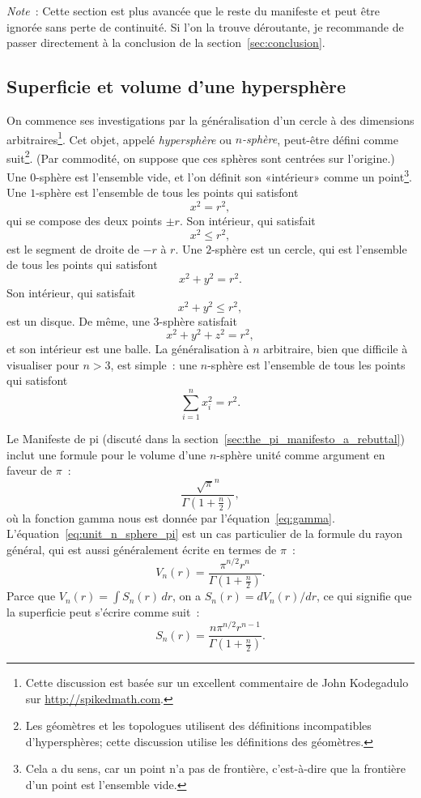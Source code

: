 \emph{Note}~: Cette section est plus avancée que le reste du manifeste et peut
être ignorée sans perte de continuité. Si l'on la trouve déroutante, je
recommande de passer directement à la conclusion de la
section~\ref{sec:conclusion}.

  \subsection{Superficie et volume d'une hypersphère} %
  \label{sec:volume_of_a_hypersphere}

On commence ses investigations par la généralisation d'un cercle à des
dimensions arbitraires\ns\footnote{Cette discussion est basée sur un excellent
commentaire de John Kodegadulo sur \url{http://spikedmath.com}.}. Cet objet,
appelé \emph{hypersphère} ou \emph{$n$-sphère}, peut-être défini comme
suit\ns\footnote{Les géomètres et les topologues utilisent des définitions
incompatibles d'hypersphères\ns; cette discussion utilise les définitions des
géomètres.}. (Par commodité, on suppose que ces sphères sont centrées sur
l'origine.) Une $0$-sphère est l'ensemble vide, et l'on définit son
«\ns intérieur\ns » comme un point\ns\footnote{Cela a du sens, car un point n'a pas
de frontière, c'est-à-dire que la frontière d'un point est l'ensemble vide.}.
Une $1$-sphère est l'ensemble de tous les points qui satisfont
\[
x^2 = r^2,
\]
qui se compose des deux points $\pm r$. Son intérieur, qui satisfait
\[
x^2 \leq r^2,
\]
est le segment de droite de $-r$ à $r$. Une $2$-sphère est un cercle, qui est
l'ensemble de tous les points qui satisfont
\[
x^2 + y^2 = r^2.
\]
Son intérieur, qui satisfait
\[
x^2 + y^2 \leq r^2,
\]
est un disque. De même, une $3$-sphère satisfait
\[
x^2 + y^2 + z^2 = r^2,
\]
et son intérieur est une balle. La généralisation à $n$ arbitraire, bien que
difficile à visualiser pour $n > 3$, est simple~: une $n$-sphère est l'ensemble
de tous les points qui satisfont
\[
\sum_{i=1}^{n} x_i^2 = r^2.
\]

Le Manifeste de pi (discuté dans la
section~\ref{sec:the_pi_manifesto_a_rebuttal}) inclut une formule pour le volume
d'une $n$-sphère unité comme argument en faveur de $\pi$~:
\begin{equation}
\label{eq:unit_n_sphere_pi}
\frac{\sqrt{\pi}^{n} }{\Gamma(1 + \frac{n}{2})},
\end{equation}
où la fonction gamma nous est donnée par l'équation~\eqref{eq:gamma}.
L'équation~\eqref{eq:unit_n_sphere_pi} est un cas particulier de la formule du
rayon général, qui est aussi généralement écrite en termes de $\pi$~:
\begin{equation}
\label{eq:n_sphere_pi}
V_n(r) = \frac{\pi^{n/2} r^n}{\Gamma(1 + \frac{n}{2})}.
\end{equation}
Parce que $V_n(r) = \int S_n(r)\,dr$, on a $S_n(r) = dV_n(r)/dr$, ce qui
signifie que la superficie peut s'écrire comme suit~:
\begin{equation}
\label{eq:n_sphere_pi_r}
S_n(r) = \frac{n \pi^{n/2} r^{n-1}}{\Gamma(1 + \frac{n}{2})}.
\end{equation}

